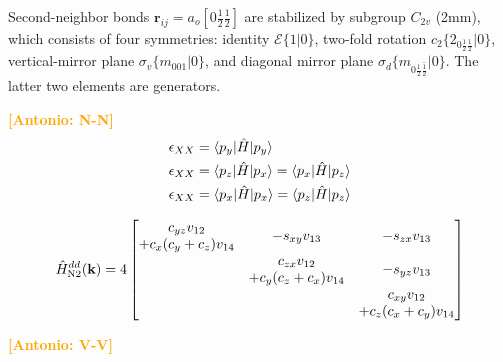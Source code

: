 \documentclass[twocolumn,showpacs,preprintnumbers,superscriptaddress,prb,floatfix,aps,10pt]{revtex4-1}
\newcommand{\abmei}[1]{\textcolor{orange}{ \bf [Antonio: #1] }}
\renewcommand{\vec}[1]{\ensuremath{\mathbf{#1}}}
\newcommand*{\ham}{\hat{H}}
\newcommand*{\id}{\mathcal{E}}
\newcommand*{\bondvec}{\vec{r}_{ij}}
\newcommand{\seitz}[2]{\{#1|#2\}}
\begin{document}

Second-neighbor bonds $\bondvec = a_o[0\frac{1}{2}\frac{1}{2}]$ are stabilized by subgroup $C_{2v}$ (2mm), which consists of four symmetries: identity $\id \seitz{1}{0}$, two-fold rotation $c_2 \seitz{ 2_{0\frac{1}{2}\frac{1}{2}} }{0}$, vertical-mirror plane $\sigma_v \seitz{m_{001}}{0}$, and diagonal mirror plane $\sigma_d \seitz{m_{0\frac{1}{2}\bar{\frac{1}{2}}}}{0}$. The latter two elements are generators.

\abmei{N-N}
\begin{align}
\epsilon_{XX} &
= \braket{p_{y} | \ham | p_y } \\
\epsilon_{XX} &
= \braket{p_{z} | \ham | p_x }
= \braket{p_{x} | \ham | p_z } \\
\epsilon_{XX} &
= \braket{p_{x} | \ham | p_x }
= \braket{p_{z} | \ham | p_z } \\
\end{align}



\begin{equation}
\ham_{\textrm{N2}}^{dd}(\vec{k}) = 4
\begin{bmatrix}
              c_{yz} v_{12} & \multirow{2}{*}{$-s_{xy} v_{13}$} & \multirow{2}{*}{$-s_{zx} v_{13}$}  \\
+c_{x} (c_{y}+c_{z}) v_{14} &                                   &                                    \\
\multirow{2}{*}{ }          &               c_{zx} v_{12}       & \multirow{2}{*}{$-s_{yz} v_{13}$}  \\
                            & +c_{y} (c_{z}+c_{x}) v_{14}       &                                    \\
\multirow{2}{*}{ }          & \multirow{2}{*}{ }                &          c_{xy} v_{12}             \\ 
                            &                                   &        +c_{z} (c_{x}+c_{y}) v_{14} \\
\end{bmatrix}
\end{equation}



\abmei{V-V}
\end{document}
